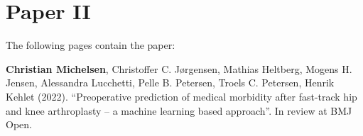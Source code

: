 \chapter{Paper II}
\label{chapter:hospital}

The following  pages contain the paper:
\vspace*{1cm}


\textbf{Christian Michelsen}, Christoffer C. Jørgensen, Mathias Heltberg, Mogens H. Jensen, Alessandra Lucchetti, Pelle B. Petersen, Troels C. Petersen, Henrik Kehlet (2022). ``Preoperative prediction of medical morbidity after fast-track hip and knee arthroplasty -- a machine learning based approach''. In review at BMJ Open.


\clearpage
